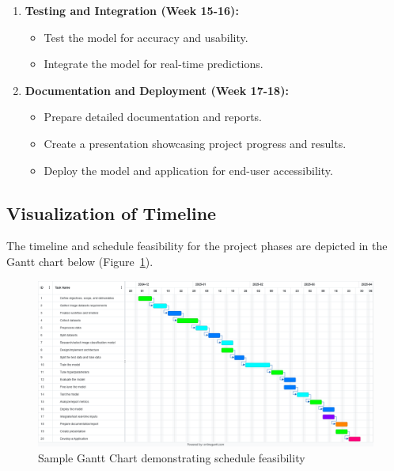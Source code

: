 \begin{enumerate}
    \item \textbf{Testing and Integration (Week 15-16):}
    \begin{itemize}
        \item Test the model for accuracy and usability.
        \item Integrate the model for real-time predictions.
    \end{itemize}
    
    \item \textbf{Documentation and Deployment (Week 17-18):}
    \begin{itemize}
        \item Prepare detailed documentation and reports.
        \item Create a presentation showcasing project progress and results.
        \item Deploy the model and application for end-user accessibility.
    \end{itemize}
\end{enumerate}


\subsection{Visualization of Timeline}
The timeline and schedule feasibility for the project phases are depicted in the Gantt chart below (Figure~\ref{fig:gantt-chart}).

\begin{figure}[H]
    \centering
    \includegraphics[width=1\linewidth]{Images/gantt.png}
    \caption{Sample Gantt Chart demonstrating schedule feasibility}
    \label{fig:gantt-chart}
\end{figure}

